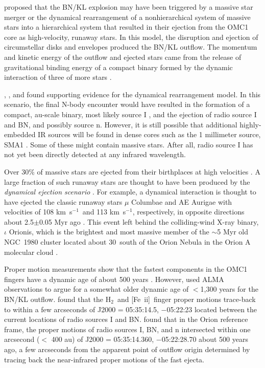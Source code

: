 \documentclass{aa}
\newcommand{\kms}{km~s{$^{-1}$}}
\newcommand{\Feii}{[Fe~{\sc ii}]}
\newcommand{\hh}{\ensuremath{\textrm{H}_{2}}}			%
\begin{document}
\citet{BallyZinnecker2005} proposed that the  BN/KL explosion may have
been triggered by a massive star merger or  the dynamical rearrangement 
of a nonhierarchical system of massive stars into a hierarchical system 
that resulted in their ejection from the OMC1 core as high-velocity, runaway stars.  
In this model,  the disruption and ejection of 
circumstellar  disks and envelopes  produced  the BN/KL outflow.  The 
momentum and kinetic energy of the outflow and ejected  stars came from 
the release of gravitational  binding energy of a compact binary  formed  
by the dynamic interaction of  three of more stars 
\citep{PovedaRuizAllen1967,Gualandris2004,Perets2012,ReipurthMikkola2010,ReipurthMikkola2012}.  
 
\citet{Zapata2009},  \citet{Bally2011}, and \citet{Goddi2011} found supporting 
evidence for the  dynamical  rearrangement model.    In this scenario, 
the final N-body encounter would have resulted in the formation 
of a compact,  au-scale binary,   most likely source I , and the ejection of 
radio source  I and BN, and possibly source n.    However, it is still possible 
that additional highly-embedded IR sources will be found in dense cores such
as the 1 millimeter source, SMA1  \citep{BeutherNissen2008}.  Some of these
might contain massive stars.   After all, radio source I has not yet been directly
detected at any infrared wavelength.
 

Over 30\% of massive stars are ejected from their birthplaces at high velocities
\citep{GiesBolton1986}.   A large fraction of such runaway stars are thought
to have been produced by the {\it dynamical ejection scenario}
\citep{PovedaRuizAllen1967}.    For example, a  dynamical  interaction
is thought to have ejected the classic runaway stars $\mu$ Columbae and
AE Aurigae with velocities of 108 \kms\  and 113 \kms ,  respectively,  in opposite
directions about 2.5$\pm$0.05 Myr ago \citep{Hoogerwerf2000, Hoogerwerf2001,
Gualandris2004}.    This event left behind the colliding-wind X-ray binary,
$\iota$ Orionis, which is the brightest and most massive member of the
$\sim$5 Myr old NGC~1980 cluster located about 30\arcmin\ south of the
Orion Nebula in the Orion A molecular cloud \citep{AlvesBouy2012,Bouy2014}.  

Proper motion  measurements show that the  fastest components in the  OMC1 
fingers have a  dynamic age of about 500  years \citep{Bally2011}.     However,   
\citet{Wu2014arXiv1} used ALMA observations to argue for a somewhat older
dynamic age of $<$1,300 years for the BN/KL outflow.    \citet{Bally2011} found 
that  the \hh\  and \Feii\  finger proper motions trace-back to within a 
few arcseconds of   J2000 = 05:35:14.5, $-$05:22:23 located between the current 
locations of  radio sources I and BN.     \citet{Gomez2008} found that in the Orion 
reference frame, the proper motions of radio sources I, BN, and n intersected 
within one arcsecond ($<$ 400 au) of  J2000 = 05:35:14.360, $-$05:22:28.70  
about 500 years ago, a few arcseconds from the apparent point of outflow origin 
determined by tracing back the near-infrared proper motions of the fast ejecta. 
 
\end{document}
